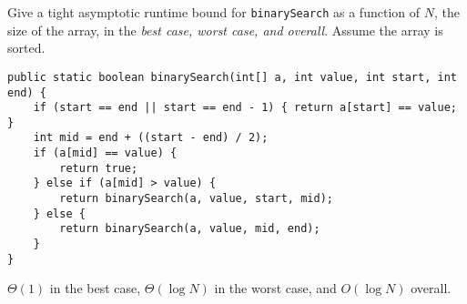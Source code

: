 \begin{blocksection}
\question Give a tight asymptotic runtime bound for \lstinline$binarySearch$ as
a function of $N$, the size of the array, in the \emph{best case, worst case,
and overall}. Assume the array is sorted.

\begin{lstlisting}
public static boolean binarySearch(int[] a, int value, int start, int end) {
    if (start == end || start == end - 1) { return a[start] == value; }
    int mid = end + ((start - end) / 2);
    if (a[mid] == value) {
        return true;
    } else if (a[mid] > value) {
        return binarySearch(a, value, start, mid);
    } else {
        return binarySearch(a, value, mid, end);
    }
}
\end{lstlisting}

\begin{solution}[0.5in]
$\Theta(1)$ in the best case, $\Theta(\log N)$ in the worst case, and $O(\log N)$ overall.
\end{solution}
\end{blocksection}
